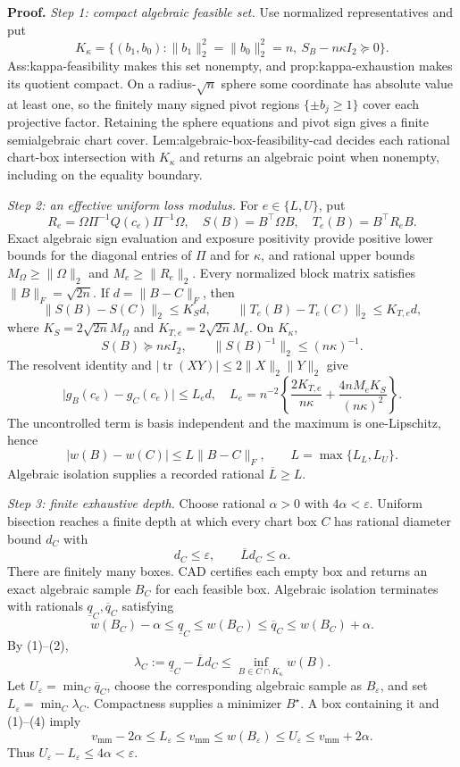 \textbf{Proof.}
\emph{Step 1: compact algebraic feasible set.}
Use normalized representatives and put
\[
 K_\kappa=\{(b_1,b_0):\lVert b_1\rVert_2^2=\lVert b_0\rVert_2^2=n,
 \ S_B-n\kappa I_2\succeq0\}.
\]
Ass:kappa-feasibility makes this set nonempty, and prop:kappa-exhaustion makes its quotient compact.  On a radius-\(\sqrt n\) sphere some coordinate has absolute value at least one, so the finitely many signed pivot regions \(\{\pm b_j\ge1\}\) cover each projective factor.  Retaining the sphere equations and pivot sign gives a finite semialgebraic chart cover.  Lem:algebraic-box-feasibility-cad decides each rational chart-box intersection with \(K_\kappa\) and returns an algebraic point when nonempty, including on the equality boundary.

\emph{Step 2: an effective uniform loss modulus.}
For \(e\in\{L,U\}\), put
\[
 R_e=\Omega\Pi^{-1}Q(c_e)\Pi^{-1}\Omega,
 \quad S(B)=B^{\top}\Omega B,
 \quad T_e(B)=B^{\top}R_eB.
\]
Exact algebraic sign evaluation and exposure positivity provide positive lower bounds for the diagonal entries of \(\Pi\) and for \(\kappa\), and rational upper bounds \(M_\Omega\ge\lVert\Omega\rVert_2\) and \(M_e\ge\lVert R_e\rVert_2\).  Every normalized block matrix satisfies \(\lVert B\rVert_F=\sqrt{2n}\).  If \(d=\lVert B-C\rVert_F\), then
\[
 \lVert S(B)-S(C)\rVert_2\le K_Sd,
 \qquad \lVert T_e(B)-T_e(C)\rVert_2\le K_{T,e}d,
\]
where \(K_S=2\sqrt{2n}M_\Omega\) and \(K_{T,e}=2\sqrt{2n}M_e\).  On \(K_\kappa\),
\[
 S(B)\succeq n\kappa I_2,
 \qquad \lVert S(B)^{-1}\rVert_2\le(n\kappa)^{-1}.
\]
The resolvent identity and \(\lvert\operatorname{tr}(XY)\rvert\le2\lVert X\rVert_2\lVert Y\rVert_2\) give
\[
 \lvert g_B(c_e)-g_C(c_e)\rvert\le L_ed,
 \quad
 L_e=n^{-2}\left\{\frac{2K_{T,e}}{n\kappa}
 +\frac{4nM_eK_S}{(n\kappa)^2}\right\}.
\]
The uncontrolled term is basis independent and the maximum is one-Lipschitz, hence
\[
 \lvert w(B)-w(C)\rvert\le L\lVert B-C\rVert_F,
 \qquad L=\max\{L_L,L_U\}. \tag{1}
\]
Algebraic isolation supplies a recorded rational \(\overline L\ge L\).

\emph{Step 3: finite exhaustive depth.}
Choose rational \(\alpha>0\) with \(4\alpha<\varepsilon\).  Uniform bisection reaches a finite depth at which every chart box \(C\) has rational diameter bound \(d_C\) with
\[
 d_C\le\varepsilon,
 \qquad \overline Ld_C\le\alpha. \tag{2}
\]
There are finitely many boxes.  CAD certifies each empty box and returns an exact algebraic sample \(B_C\) for each feasible box.  Algebraic isolation terminates with rationals \(\underline q_C,\overline q_C\) satisfying
\[
 w(B_C)-\alpha\le\underline q_C\le w(B_C)
 \le\overline q_C\le w(B_C)+\alpha. \tag{3}
\]
By (1)--(2),
\[
 \lambda_C:=\underline q_C-\overline Ld_C
 \le\inf_{B\in C\cap K_\kappa}w(B). \tag{4}
\]
Let \(U_\varepsilon=\min_C\overline q_C\), choose the corresponding algebraic sample as \(B_\varepsilon\), and set \(L_\varepsilon=\min_C\lambda_C\).  Compactness supplies a minimizer \(B^\star\).  A box containing it and (1)--(4) imply
\[
 v_{\mathrm{mm}}-2\alpha\le L_\varepsilon\le v_{\mathrm{mm}}
 \le w(B_\varepsilon)\le U_\varepsilon\le v_{\mathrm{mm}}+2\alpha.
\]
Thus \(U_\varepsilon-L_\varepsilon\le4\alpha<\varepsilon\).

